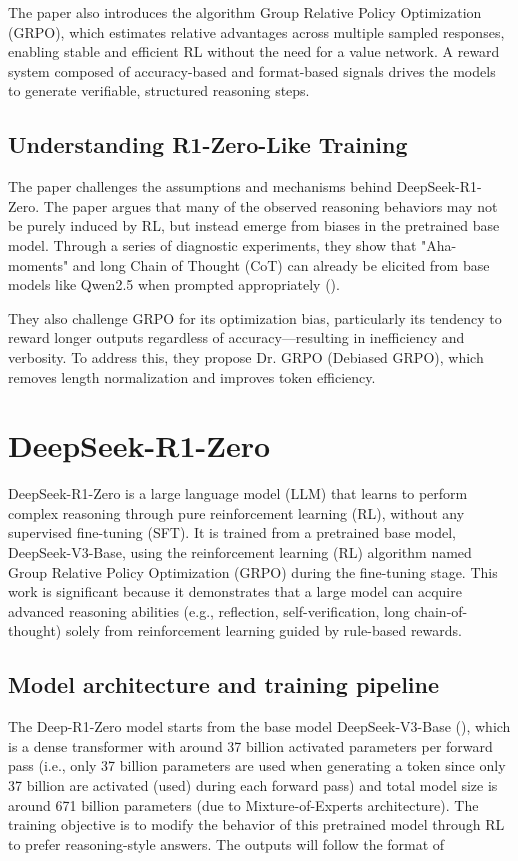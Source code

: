 \documentclass{article} %
\begin{document}
The paper also introduces the algorithm Group Relative Policy Optimization (GRPO), which estimates relative advantages across multiple sampled responses, enabling stable and efficient RL without the need for a value network. A reward system composed of accuracy-based and format-based signals drives the models to generate verifiable, structured reasoning steps.

\subsection{Understanding R1-Zero-Like Training}
The paper challenges the assumptions and mechanisms behind DeepSeek-R1-Zero. The paper argues that many of the observed reasoning behaviors may not be purely induced by RL, but instead emerge from biases in the pretrained base model. Through a series of diagnostic experiments, they show that "Aha-moments" and long Chain of Thought (CoT) can already be elicited from base models like Qwen2.5 when prompted appropriately ()\cite{wei2022cot}.

They also challenge GRPO for its optimization bias, particularly its tendency to reward longer outputs regardless of accuracy—resulting in inefficiency and verbosity. To address this, they propose Dr. GRPO (Debiased GRPO), which removes length normalization and improves token efficiency. 

\section{DeepSeek-R1-Zero}
DeepSeek-R1-Zero is a large language model (LLM) that learns to perform complex reasoning through pure reinforcement learning (RL), without any supervised fine-tuning (SFT). It is trained from a pretrained base model, DeepSeek-V3-Base, using the reinforcement learning (RL) algorithm named Group Relative Policy Optimization (GRPO) during the fine-tuning stage. This work is significant because it demonstrates that a large model can acquire advanced reasoning abilities (e.g., reflection, self-verification, long chain-of-thought) solely from reinforcement learning guided by rule-based rewards.

\subsection{Model architecture and training pipeline}
The Deep-R1-Zero model starts from the base model DeepSeek-V3-Base (\cite{deepseek2023v3}), which is a dense transformer with around 37 billion activated parameters per forward pass (i.e., only 37 billion parameters are used when generating a token since only 37 billion are activated (used) during each forward pass) and total model size is around 671 billion parameters (due to Mixture-of-Experts architecture). The training objective is to modify the behavior of this pretrained model through RL to prefer reasoning-style answers. The outputs will follow the format of 
\end{document}
